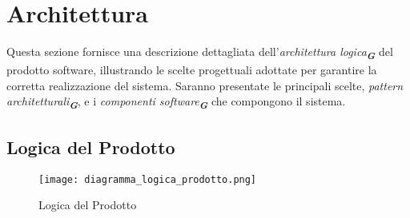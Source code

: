 
\section{Architettura}
\label{sec:architettura}

Questa sezione fornisce una descrizione dettagliata dell'\emph{architettura logica}\textsubscript{\textbf{\textit{G}}} del prodotto software, illustrando le scelte progettuali adottate per garantire la corretta realizzazione del sistema. Saranno presentate le principali scelte, \emph{pattern architetturali}\textsubscript{\textbf{\textit{G}}}, e i \emph{componenti software}\textsubscript{\textbf{\textit{G}}} che compongono il sistema.

\subsection{Logica del Prodotto}
\label{sec:logica_prodotto}

\begin{figure}[h]
    \centering
    \texttt{[image: diagramma\_logica\_prodotto.png]}
    \caption{Logica del Prodotto}
\end{figure}

